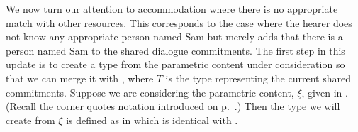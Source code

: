 We now turn our attention to accommodation where there is no
appropriate match
with other resources.  This corresponds to the case where the hearer
does not know any appropriate person named Sam but merely adds that
there is a person named Sam to the shared dialogue commitments.
The first step in this update is to create a type from the parametric
content under consideration so that we can merge it with
, where $T$ is the type
representing the current shared commitments.  
Suppose we are considering the parametric content, $\xi$, given in
. (Recall the corner quotes notation introduced on p.~\pageref{ex:cornerquote-notation}.) Then the type we will create from $\xi$ is defined as in
 which is identical with .
